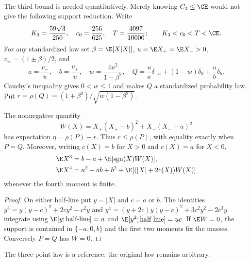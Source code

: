 The third bound is needed quantitatively.  Merely knowing $C_3\le\CE$
would not give the following support reduction.
Write
\[
 K_3=\frac{59\sqrt3}{250},\quad c_0=\frac{256}{625},\quad
 T=\frac{4097}{10000};\qquad K_3<c_0<T<\CE.
\]
For any standardized law set
$\beta=\E[X|X|]$, $u=\E X_+=\E X_->0$,
$v_\pm=(1\pm\beta)/2$, and
\begin{equation}\label{j:finite:n4-reference}
 a=\frac{v_-}{u},\quad b=\frac{v_+}{u},\quad
 w=\frac{4u^2}{1-\beta^2},\quad
 Q=\frac ua\delta_{-a}+(1-w)\delta_0+\frac ub\delta_b.
\end{equation}
Cauchy's inequality gives $0<w\le1$ and makes $Q$ a standardized
probability law.  Put $r=\rho(Q)=(1+\beta^2)/\sqrt{w(1-\beta^2)}$.
\begin{lemma}\label{j:finite:n4-excess}
The nonnegative quantity
\[
 W(X)=X_+(X_+-b)^2+X_-(X_--a)^2
\]
has expectation $\eta=\rho(P)-r$.  Thus $r\le\rho(P)$, with
equality exactly when $P=Q$.  Moreover, writing $c(X)=b$ for $X>0$
and $c(X)=a$ for $X<0$,
\begin{align}
 \E X^3&=b-a+\E[\operatorname{sgn}(X)W(X)],\notag\\
 \E X^4&=a^2-ab+b^2+\E[(|X|+2c(X))W(X)]
 \label{j:finite:n4-physical-moments}
\end{align}
whenever the fourth moment is finite.
\end{lemma}
\begin{proof}
On either half-line put $y=|X|$ and $c=a$ or $b$.  The identities
$y^3=y(y-c)^2+2cy^2-c^2y$ and
$y^4=(y+2c)y(y-c)^2+3c^2y^2-2c^3y$ integrate using
$\E[y;\text{half-line}]=u$ and
$\E[y^2;\text{half-line}]=uc$.
If $\E W=0$, the support is contained in $\{-a,0,b\}$ and the
first two moments fix the masses.  Conversely $P=Q$ has $W=0$.
\end{proof}
The three-point law is a reference;
the original law remains arbitrary.

